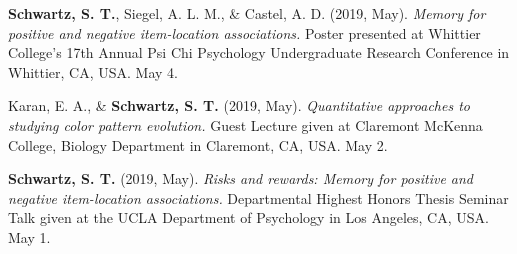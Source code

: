 {\bf Schwartz, S. T.}, Siegel, A. L. M., \& Castel, A. D. (2019, May). {\it Memory for positive and negative item-location associations.} Poster presented at Whittier College's 17th Annual Psi Chi Psychology Undergraduate Research Conference in Whittier, CA, USA. May 4.

Karan, E. A., \& {\bf Schwartz, S. T.} (2019, May). {\it Quantitative approaches to studying color pattern evolution.} Guest Lecture given at Claremont McKenna College, Biology Department in Claremont, CA, USA. May 2.

{\bf Schwartz, S. T.} (2019, May). {\it Risks and rewards: Memory for positive and negative item-location associations.} Departmental Highest Honors Thesis Seminar Talk given at the UCLA Department of Psychology in Los Angeles, CA, USA. May 1.